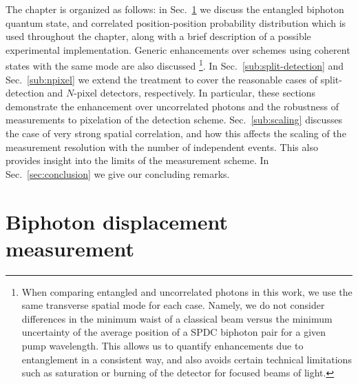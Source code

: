 The chapter is organized as follows: 
in Sec.~\ref{sec:biphoton displacement} we discuss the entangled biphoton quantum state, and correlated position-position probability distribution which is used throughout the chapter, along with a brief description of a possible experimental implementation.  
Generic enhancements over schemes using coherent states with the same mode are also discussed \footnote{When comparing entangled and uncorrelated photons in this work, we use the same transverse spatial mode for each case.  
	Namely, we do not consider differences in the minimum waist of a classical beam versus the minimum uncertainty of the average position of a SPDC biphoton pair for a given pump wavelength.  
	This allows us to quantify enhancements due to entanglement in a consistent way, and also avoids certain technical limitations such as saturation or burning of the detector for focused beams of light.}.
In Sec.~\ref{sub:split-detection} and Sec.~\ref{sub:npixel} we extend the treatment to cover the reasonable cases of split-detection and $N$-pixel detectors, respectively.
In particular, these sections demonstrate the enhancement over uncorrelated photons and the robustness of measurements to pixelation of the detection scheme.
Sec.~\ref{sub:scaling} discusses the case of very strong spatial correlation, and how this affects the scaling of the measurement resolution with the number of independent events.
This also provides insight into the limits of the measurement scheme.
In Sec.~\ref{sec:conclusion} we give our concluding remarks.

\section{Biphoton displacement measurement}\label{sec:biphoton displacement}

